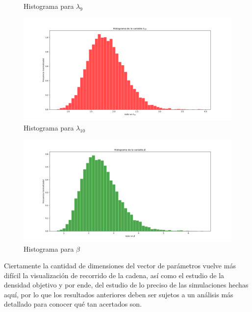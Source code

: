 \documentclass[letterpaper]{article}
\newcommand{\1}{\mathds{1}}
\theoremstyle{definition}
\theoremstyle{definition}
\theoremstyle{definition}
\theoremstyle{definition}
\theoremstyle{definition}
\begin{document}
\begin{itemize}
\begin{figure}[h!]
        \caption{Histograma para $\lambda_{9}$}
    \end{figure} 
    \begin{figure}[h!]
        \centering
        \includegraphics[width=\linewidth]{22.png}
        \caption{Histograma para $\lambda_{10}$}
    \end{figure} 
    \begin{figure}[h!]
        \centering
        \includegraphics[width=\linewidth]{23.png}
        \caption{Histograma para $\beta$}
    \end{figure} 
    Ciertamente la cantidad de dimensiones del vector de parámetros vuelve más difícil
    la visualización de recorrido de la cadena, así como el estudio 
    de la densidad objetivo y por ende, del estudio de lo preciso de las simulaciones 
    hechas aquí, por lo que los resultados anteriores deben ser sujetos a un análisis más detallado para conocer qué tan 
    acertados son.\\


\end{itemize}
\end{document}
